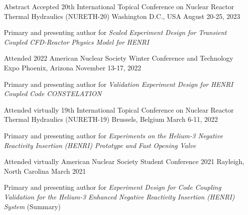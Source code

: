 
\begin{cventries}

    \cventry
    {Abstract Accepted} %
    {20th International Topical Conference on Nuclear Reactor Thermal Hydraulics (NURETH-20)} %
    {Washington D.C., USA} %
    {August 20-25, 2023} %
    {
    \begin{cvitems}
        \item{Primary and presenting author for \textit{Scaled Experiment Design for Transient Coupled CFD-Reactor Physics Model for HENRI}}
    \end{cvitems}
    }


    \cventry
    {Attended} %
    {2022 American Nuclear Society Winter Conference and Technology Expo} %
    {Phoenix, Arizona} %
    {November 13-17, 2022} %
    {
    \begin{cvitems}
        \item{Primary and presenting author for \textit{Validation Experiment Design for HENRI Coupled Code CONSTELATION}}
    \end{cvitems}
    }

    \cventry
    {Attended virtually} %
    {19th International Topical Conference on Nuclear Reactor Thermal Hydraulics (NURETH-19)} %
    {Brussels, Belgium} %
    {March 6-11, 2022} %
    {
    \begin{cvitems}
        \item{Primary and presenting author for \textit{Experiments on the Helium-3 Negative Reactivity Insertion (HENRI) Prototype and Fast Opening Valve}}
    \end{cvitems}
    }

    \cventry
    {Attended virtually} %
    {American Nuclear Society Student Conference 2021} %
    {Rayleigh, North Carolina} %
    {March 2021} %
    {
    \begin{cvitems}
        \item{Primary and presenting author for \textit{Experiment Design for Code Coupling Validation for the Helium-3 Enhanced Negative Reactivity Insertion (HENRI) System} (Summary)}
    \end{cvitems}
    }


\end{cventries}
